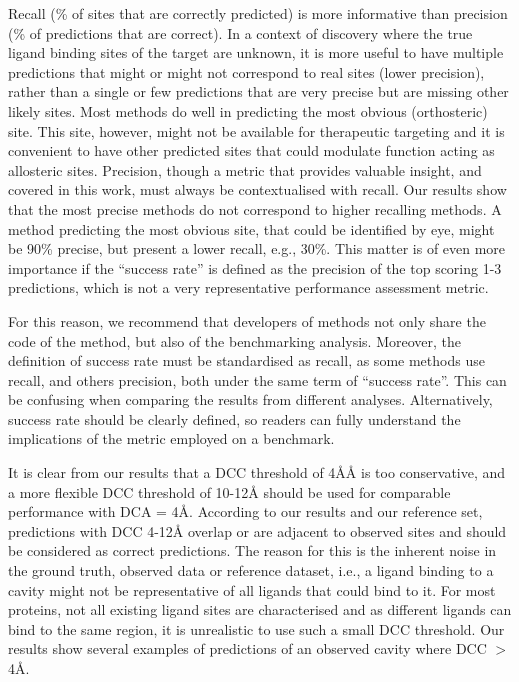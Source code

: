 Recall (\% of sites that are correctly predicted) is more informative than precision (\% of predictions that are correct). In a context of discovery where the true ligand binding sites of the target are unknown, it is more useful to have multiple predictions that might or might not correspond to real sites (lower precision), rather than a single or few predictions that are very precise but are missing other likely sites. Most methods do well in predicting the most obvious (orthosteric) site. This site, however, might not be available for therapeutic targeting and it is convenient to have other predicted sites that could modulate function acting as allosteric sites. Precision, though a metric that provides valuable insight, and covered in this work, must always be contextualised with recall. Our results show that the most precise methods do not correspond to higher recalling methods. A method predicting the most obvious site, that could be identified by eye, might be 90\% precise, but present a lower recall, e.g., 30\%. This matter is of even more importance if the ``success rate'' is defined as the precision of the top scoring 1-3 predictions, which is not a very representative performance assessment metric.

For this reason, we recommend that developers of methods not only share the code of the method, but also of the benchmarking analysis. Moreover, the definition of success rate must be standardised as recall, as some methods use recall, and others precision, both under the same term of ``success rate''. This can be confusing when comparing the results from different analyses. Alternatively, success rate should be clearly defined, so readers can fully understand the implications of the metric employed on a benchmark.

It is clear from our results that a DCC threshold of 4\AA{Å} is too conservative, and a more flexible DCC threshold of 10-12\AA{} should be used for comparable performance with DCA = 4\AA{}. According to our results and our reference set, predictions with DCC 4-12\AA{} overlap or are adjacent to observed sites and should be considered as correct predictions. The reason for this is the inherent noise in the ground truth, observed data or reference dataset, i.e., a ligand binding to a cavity might not be representative of all ligands that could bind to it. For most proteins, not all existing ligand sites are characterised and as different ligands can bind to the same region, it is unrealistic to use such a small DCC threshold. Our results show several examples of predictions of an observed cavity where DCC $>$ 4\AA{}.


